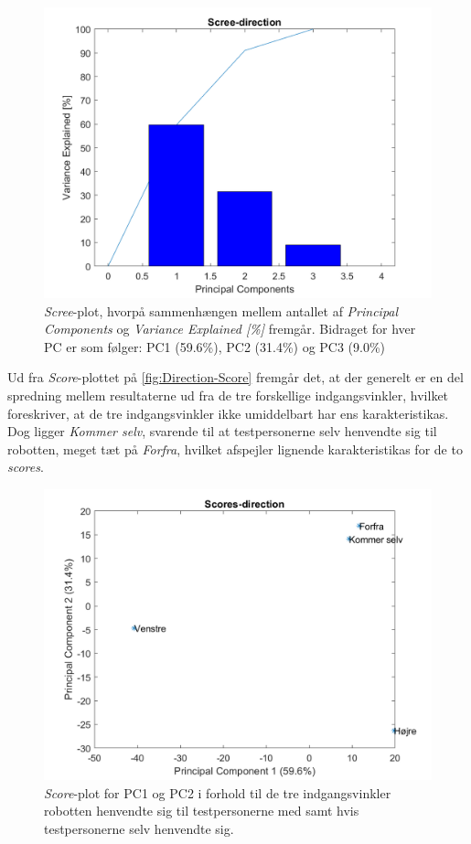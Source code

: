 \begin{figure}[H]
\centering
\includegraphics[width=\textwidth]{Figure/DatabehandlingSkalaer/PCAfigures/Direction-Scree.png}
\caption{\textit{Scree}-plot, hvorpå sammenhængen mellem antallet af \textit{Principal Components} og \textit{Variance Explained [\%]} fremgår. Bidraget for hver PC er som følger: PC1 (59.6\%), PC2 (31.4\%) og PC3 (9.0\%)}
\label{fig:Direction-Scree}
\end{figure}
\newpage
\noindent
% 
Ud fra \textit{Score}-plottet på \autoref{fig:Direction-Score} fremgår det, at der generelt er en del spredning mellem resultaterne ud fra de tre forskellige indgangsvinkler, hvilket foreskriver, at de tre indgangsvinkler ikke umiddelbart har ens karakteristikas. Dog ligger \textit{Kommer selv}, svarende til at testpersonerne selv henvendte sig til robotten, meget tæt på \textit{Forfra}, hvilket afspejler lignende karakteristikas for de to \textit{scores}. 
%
\begin{figure}[H]
\centering
\includegraphics[width=\textwidth]{Figure/DatabehandlingSkalaer/PCAfigures/Direction-Scores}
\caption{\textit{Score}-plot for PC1 og PC2 i forhold til de tre indgangsvinkler robotten henvendte sig til testpersonerne med samt hvis testpersonerne selv henvendte sig.}
\label{fig:Direction-Score}
\end{figure}
